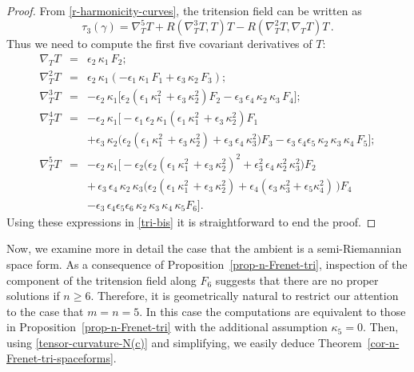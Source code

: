 \documentclass[11pt]{amsart}
\theoremstyle{plain}
\theoremstyle{definition}
\numberwithin{equation}{section}
\begin{document}
\begin{proof}
From \eqref{r-harmonicity-curves}, the tritension field can be written as
\begin{equation}\label{tri-bis}
\tau_3(\gamma) = \nabla_T^5 T + R(\nabla_T^3 T, T) T - R(\nabla_T^2 T, \nabla_T T) T\,.
\end{equation}
Thus we need to compute the first five covariant derivatives of $T$:
\begin{eqnarray*}
\nabla_T T &=& \epsilon_2 \, \kappa_1 \, F_2;\\
\nabla_T^2 T &=& \epsilon_2 \, \kappa_1 ( - \epsilon_1 \, \kappa_1 \, F_1 + \epsilon_3 \, \kappa_2 \, F_3 ) ;\\
\nabla_T^3 T &=& - \epsilon_2 \, \kappa_1 \big[  \epsilon_2 (\epsilon_1\, \kappa_1^2 \,  + \epsilon_3 \, \kappa_2^2 ) F_2 - \epsilon_3 \, \epsilon_4 \,\kappa_2 \, \kappa_3 \, F_4\big];\\
\nabla_T^4 T 
&=& - \epsilon_2 \, \kappa_1 \big[ - \epsilon_1 \, \epsilon_2 \, \kappa_1  (\epsilon_1\, \kappa_1^2 \,  + \epsilon_3 \, \kappa_2^2 ) F_1 \\
&&+ \epsilon_3 \, \kappa_2 \big(\epsilon_2 (\epsilon_1\, \kappa_1^2 \,  + \epsilon_3 \, \kappa_2^2 ) + \epsilon_3 \, \epsilon_4  \, \kappa_3^2 \big) F_3 
 - \epsilon_3 \, \epsilon_4 \epsilon_5 \,\kappa_2 \, \kappa_3 \, \kappa_4 \, F_5 \big];\\
\nabla_T^5 T 
&=& - \epsilon_2 \, \kappa_1 \big[ - \epsilon_2 \big( \epsilon_2 (\epsilon_1\, \kappa_1^2 \,  + \epsilon_3 \, \kappa_2^2)^2  + \epsilon_3^2 \, \epsilon_4  \, \kappa_2^2 \, \kappa_3^2 \big) F_2 \\
&&+ \, \epsilon_3 \, \epsilon_4 \,  \kappa_2 \, \kappa_3 \big(\epsilon_2 (\epsilon_1\, \kappa_1^2 \,  + \epsilon_3 \, \kappa_2^2  )+ \epsilon_4 (\epsilon_3 \,  \kappa_3^2 + \epsilon_5 \kappa_4^2 )\, \big) F_4\\
&&  -\epsilon_3 \, \epsilon_4 \epsilon_5 \epsilon_6 \,\kappa_2 \, \kappa_3 \, \kappa_4 \, \kappa_5 F_6\big ].
\end{eqnarray*}
Using these expressions in \eqref{tri-bis} it is straightforward to end the proof.
\end{proof}

Now, we examine more in detail the case that the ambient is a semi-Rie\-mannian space form. As a consequence of Proposition~\ref{prop-n-Frenet-tri}, inspection of the component of the tritension field along $F_6$ suggests that there are no proper solutions if $n \geq 6 $. Therefore, it is geometrically natural to restrict our attention to the case that $m=n=5$. In this case the computations are equivalent to those in Proposition~\ref{prop-n-Frenet-tri} with the additional assumption $\kappa_5=0$. Then, using \eqref{tensor-curvature-N(c)} and simplifying, we easily deduce Theorem~\ref{cor-n-Frenet-tri-spaceforms}.\\
\end{document}
